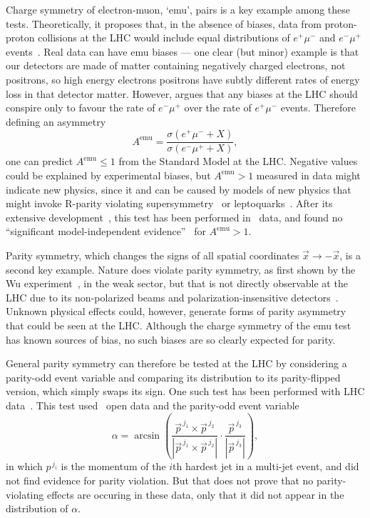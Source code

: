 Charge symmetry of electron-muon, `emu', pairs is a key example among these
tests.
Theoretically, it proposes that, in the absence of biases, data
from proton-proton collisions at the LHC would include equal distributions
of $e^+\mu^-$ and $e^-\mu^+$ events~\cite{Lester:2016qdv}.
Real data can have emu biases --- one clear (but minor) example is that our
detectors are made of matter containing negatively charged electrons, not
positrons, so high energy electrons positrons have subtly different rates of
energy loss in that detector matter.
However, \cite{Lester:2016qdv} argues that any biases at the LHC should
conspire only to favour the rate of $e^-\mu^+$ over the rate of $e^+\mu^-$
events.
Therefore defining an asymmetry
\begin{equation}
A^\mathrm{emu} = \frac{
\sigma(e^+\mu^- + X)
}{
\sigma(e^-\mu^+ + X)
}
,
\end{equation}
one can predict $A^\mathrm{emu} \leq 1$ from the Standard Model at the LHC.
Negative values could be explained by experimental biases, but
$A^\mathrm{emu} > 1$ measured in data might indicate new physics, since it and
can be caused by models of new physics that might invoke R-parity violating
supersymmetry~\cite{Lester:2016qdv} or leptoquarks~\cite{EXOT-2018-29}.
After its extensive development~\cite{Brunt:2674708,Pacey:2747774},
this test has been performed in \atlas\ data, and found no ``significant
model-independent evidence''~\cite{EXOT-2018-29} for $A^\mathrm{emu} > 1$.

Parity symmetry, which changes the signs of all spatial coordinates
$\vec x\rightarrow -\vec x$, is a second key example.
Nature does violate parity symmetry, as first shown by the Wu
experiment~\cite{PhysRev.105.1413}, in the weak sector, but that is not
directly observable at the LHC due to its non-polarized beams and
polarization-insensitive detectors~\cite{Lester:2019bso}.
Unknown physical effects could, however, generate forms of parity asymmetry
that could be seen at the LHC.
Although the charge symmetry of the emu test has known sources of bias,
no such biases are so clearly expected for parity.

General parity symmetry can therefore be tested at the LHC by considering a
parity-odd event variable and comparing its distribution to its parity-flipped
version, which simply swaps its sign.
One such test has been performed with LHC data~\cite{Lester:2019bso}.
This test used \cms\ open data and the parity-odd event variable
\begin{equation}
\label{eqn:cms_alpha}
\alpha
= \arcsin\!
\left(
\frac{
\vec p^{\,j_1} \times \vec p^{\,j_2}
}{
|\vec p^{\,j_1} \times \vec p^{\,j_2}|
}
\cdot
\frac{
\vec p^{\,j_3}
}{
|\vec p^{\,j_3}|
}
\right)
,
\end{equation}
in which $p^{\,j_i}$ is the momentum of the $i$th hardest jet in a multi-jet
event,
and did not find evidence for parity violation.
But that does not prove that no parity-violating effects are occuring in these
data, only that it did not appear in the distribution of $\alpha$.

